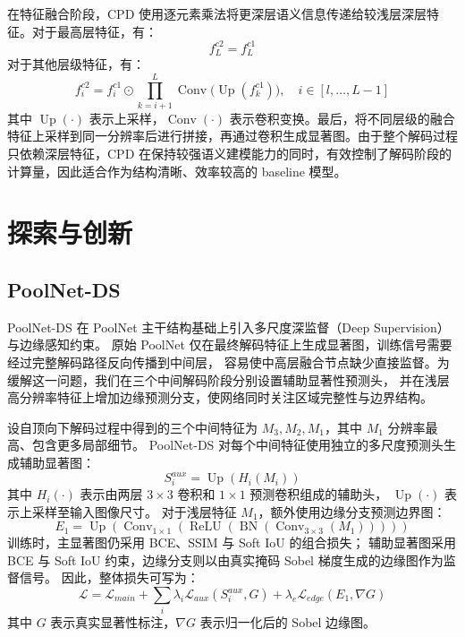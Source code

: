 \documentclass[UTF8,a4paper,10pt]{ctexart}
\begin{document}
在特征融合阶段，CPD 使用逐元素乘法将更深层语义信息传递给较浅层深层特征。对于最高层特征，有：
\[
f_L^{c2} = f_L^{c1}
\]
对于其他层级特征，有：
\[
f_i^{c2}
=
f_i^{c1}
\odot
\prod_{k=i+1}^{L}
\operatorname{Conv}
\big(
\operatorname{Up}(f_k^{c1})
\big),
\quad i \in [l,\ldots,L-1]
\]
其中 \(\operatorname{Up}(\cdot)\) 表示上采样，\(\operatorname{Conv}(\cdot)\) 表示卷积变换。最后，将不同层级的融合特征上采样到同一分辨率后进行拼接，再通过卷积生成显著图。由于整个解码过程只依赖深层特征，CPD 在保持较强语义建模能力的同时，有效控制了解码阶段的计算量，因此适合作为结构清晰、效率较高的 baseline 模型。



\section{探索与创新}

\subsection{PoolNet-DS}

PoolNet-DS 在 PoolNet 主干结构基础上引入多尺度深监督（Deep Supervision）与边缘感知约束。
原始 PoolNet 仅在最终解码特征上生成显著图，训练信号需要经过完整解码路径反向传播到中间层，
容易使中高层融合节点缺少直接监督。为缓解这一问题，我们在三个中间解码阶段分别设置辅助显著性预测头，
并在浅层高分辨率特征上增加边缘预测分支，使网络同时关注区域完整性与边界结构。

设自顶向下解码过程中得到的三个中间特征为 \(M_3,M_2,M_1\)，其中 \(M_1\) 分辨率最高、包含更多局部细节。
PoolNet-DS 对每个中间特征使用独立的多尺度预测头生成辅助显著图：
\[
S_i^{aux}
=
\operatorname{Up}
\left(
H_i(M_i)
\right)
\]
其中 \(H_i(\cdot)\) 表示由两层 \(3\times3\) 卷积和 \(1\times1\) 预测卷积组成的辅助头，
\(\operatorname{Up}(\cdot)\) 表示上采样至输入图像尺寸。
对于浅层特征 \(M_1\)，额外使用边缘分支预测边界图：
\[
E_1
=
\operatorname{Up}
\left(
\operatorname{Conv}_{1\times1}
\left(
\operatorname{ReLU}
\left(
\operatorname{BN}
\left(
\operatorname{Conv}_{3\times3}(M_1)
\right)
\right)
\right)
\right)
\]
训练时，主显著图仍采用 BCE、SSIM 与 Soft IoU 的组合损失；
辅助显著图采用 BCE 与 Soft IoU 约束，边缘分支则以由真实掩码 Sobel 梯度生成的边缘图作为监督信号。
因此，整体损失可写为：
\[
\mathcal{L}
=
\mathcal{L}_{main}
+
\sum_i \lambda_i \mathcal{L}_{aux}(S_i^{aux},G)
+
\lambda_e \mathcal{L}_{edge}(E_1,\nabla G)
\]
其中 \(G\) 表示真实显著性标注，\(\nabla G\) 表示归一化后的 Sobel 边缘图。
\end{document}
